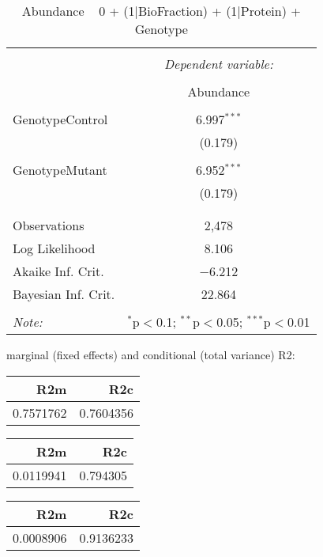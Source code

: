 \documentclass[11pt]{report}
\begin{document}
\begin{table}[!htbp] \centering 
  \caption{Abundance ~ 0 + (1|BioFraction) + (1|Protein) + Genotype} 
  \label{} 
\begin{tabular}{@{\extracolsep{5pt}}lc} 
\\[-1.8ex]\hline 
\hline \\[-1.8ex] 
 & \multicolumn{1}{c}{\textit{Dependent variable:}} \\ 
\cline{2-2} 
\\[-1.8ex] & Abundance \\ 
\hline \\[-1.8ex] 
 GenotypeControl & 6.997$^{***}$ \\ 
  & (0.179) \\ 
  & \\ 
 GenotypeMutant & 6.952$^{***}$ \\ 
  & (0.179) \\ 
  & \\ 
\hline \\[-1.8ex] 
Observations & 2,478 \\ 
Log Likelihood & 8.106 \\ 
Akaike Inf. Crit. & $-$6.212 \\ 
Bayesian Inf. Crit. & 22.864 \\ 
\hline 
\hline \\[-1.8ex] 
\textit{Note:}  & \multicolumn{1}{r}{$^{*}$p$<$0.1; $^{**}$p$<$0.05; $^{***}$p$<$0.01} \\ 
\end{tabular} 
\end{table} 
marginal (fixed effects) and conditional (total variance) R2:

\begin{tabular}{r|r}
\hline
R2m & R2c\\
\hline
0.7571762 & 0.7604356\\
\hline
\end{tabular}

\begin{tabular}{r|r}
\hline
R2m & R2c\\
\hline
0.0119941 & 0.794305\\
\hline
\end{tabular}

\begin{tabular}{r|r}
\hline
R2m & R2c\\
\hline
0.0008906 & 0.9136233\\
\hline
\end{tabular}
\end{document}

